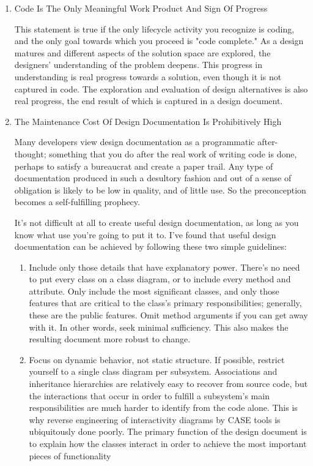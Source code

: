 \documentclass{article}
\begin{document}
\begin{enumerate}
\item Code Is The Only Meaningful Work Product And Sign Of Progress
\label{sec:orgheadline252}

This statement is true if the only lifecycle activity you recognize is
coding, and the only goal towards which you proceed is "code complete."
As a design matures and different aspects of the solution space are
explored, the designers' understanding of the problem deepens. This
progress in understanding is real progress towards a solution, even
though it is not captured in code. The exploration and evaluation of
design alternatives is also real progress, the end result of which is
captured in a design document.

\item The Maintenance Cost Of Design Documentation Is Prohibitively High
\label{sec:orgheadline253}

Many developers view design documentation as a programmatic
after-thought; something that you do after the real work of writing code
is done, perhaps to satisfy a bureaucrat and create a paper trail. Any
type of documentation produced in such a desultory fashion and out of a
sense of obligation is likely to be low in quality, and of little use.
So the preconception becomes a self-fulfilling prophecy.

It's not difficult at all to create useful design documentation, as long
as you know what use you're going to put it to. I've found that useful
design documentation can be achieved by following these two simple
guidelines:

\begin{enumerate}
\item Include only those details that have explanatory power. There's no
need to put every class on a class diagram, or to include every
method and attribute. Only include the most significant classes, and
only those features that are critical to the class's primary
responsibilities; generally, these are the public features. Omit
method arguments if you can get away with it. In other words, seek
minimal sufficiency. This also makes the resulting document more
robust to change.\\
\item Focus on dynamic behavior, not static structure. If possible,
restrict yourself to a single class diagram per subsystem.
Associations and inheritance hierarchies are relatively easy to
recover from source code, but the interactions that occur in order to
fulfill a subsystem's main responsibilities are much harder to
identify from the code alone. This is why reverse engineering of
interactivity diagrams by CASE tools is ubiquitously done poorly. The
primary function of the design document is to explain how the classes
interact in order to achieve the most important pieces of
functionality
\end{enumerate}


\end{enumerate}
\end{document}
